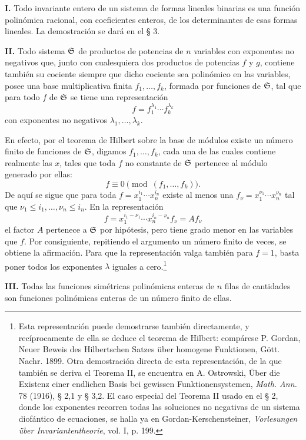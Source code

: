 \documentclass[11pt]{article}
\begin{document}
\textbf{I.} Todo invariante entero de un sistema de formas lineales binarias es una función polinómica racional, con coeficientes enteros, de los determinantes de esas formas lineales. La demostración se dará en el § 3.

\textbf{II.} Todo sistema \(\mathfrak S\) de productos de potencias de \(n\) variables con exponentes no negativos que, junto con cualesquiera dos productos de potencias \(f\) y \(g\), contiene también su cociente siempre que dicho cociente sea polinómico en las variables, posee una base multiplicativa finita \(f_1,\ldots,f_k\), formada por funciones de \(\mathfrak S\), tal que para todo \(f\) de \(\mathfrak S\) se tiene una representación
\[
        f=f_1^{\lambda_1}\cdots f_k^{\lambda_k}
\]
con exponentes no negativos \(\lambda_1,\ldots,\lambda_k\).

En efecto, por el teorema de Hilbert sobre la base de módulos existe un número finito de funciones de \(\mathfrak S\), digamos \(f_1,\ldots,f_k\), cada una de las cuales contiene realmente las \(x\), tales que toda \(f\) no constante de \(\mathfrak S\) pertenece al módulo generado por ellas:
\[
        f\equiv0\pmod{(f_1,\ldots,f_k)}.
\]
De aquí se sigue que para toda \(f=x_1^{i_1}\cdots x_n^{i_n}\) existe al menos una \(f_\nu=x_1^{\nu_1}\cdots x_n^{\nu_n}\) tal que \(\nu_1\le i_1,\ldots,\nu_n\le i_n\). En la representación
\[
        f=x_1^{i_1-\nu_1}\cdots x_n^{i_n-\nu_n} f_\nu = A f_\nu
\]
el factor \(A\) pertenece a \(\mathfrak S\) por hipótesis, pero tiene grado menor en las variables que \(f\). Por consiguiente, repitiendo el argumento un número finito de veces, se obtiene la afirmación. Para que la representación valga también para \(f=1\), basta poner todos los exponentes \(\lambda\) iguales a cero.\footnote{Esta representación puede demostrarse también directamente, y recíprocamente de ella se deduce el teorema de Hilbert: compárese P. Gordan, Neuer Beweis des Hilbertschen Satzes über homogene Funktionen, Gött. Nachr. 1899. Otra demostración directa de esta representación, de la que también se deriva el Teorema II, se encuentra en A. Ostrowski, Über die Existenz einer endlichen Basis bei gewissen Funktionensystemen, \emph{Math. Ann.} 78 (1916), § 2,1 y § 3,2. El caso especial del Teorema II usado en el § 2, donde los exponentes recorren todas las soluciones no negativas de un sistema diofántico de ecuaciones, se halla ya en Gordan-Kerschensteiner, \emph{Vorlesungen über Invariantentheorie}, vol. I, p. 199.}

\textbf{III.} Todas las funciones simétricas polinómicas enteras de \(n\) filas de cantidades son funciones polinómicas enteras de un número finito de ellas.
\end{document}
